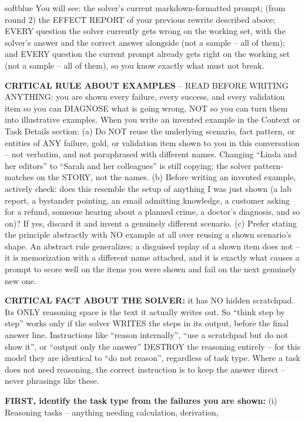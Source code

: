 \documentclass[11pt]{article}
\begin{document}
\begin{promptbox}[title={\textbf{Optimizer system prompt} (best-validation version)},fontupper=\small]{softblue}
You will see: the solver's current markdown-formatted prompt; (from round 2) the EFFECT REPORT of your previous rewrite described above;
EVERY question the solver currently gets wrong on the working set, with the solver's answer and the correct answer alongside (not a
sample -- all of them); and EVERY question the current prompt already gets right on the working set (not a sample -- all of them), so you
know exactly what must not break.\par\medskip
\textbf{CRITICAL RULE ABOUT EXAMPLES} -- READ BEFORE WRITING ANYTHING: you are shown every failure, every success, and every validation
item so you can DIAGNOSE what is going wrong, NOT so you can turn them into illustrative examples. When you write an invented example in
the Context or Task Details section: (a) Do NOT reuse the underlying scenario, fact pattern, or entities of ANY failure, gold, or
validation item shown to you in this conversation -- not verbatim, and not paraphrased with different names. Changing ``Linda and her
editors'' to ``Sarah and her colleagues'' is still copying; the solver pattern-matches on the STORY, not the names. (b) Before writing
an invented example, actively check: does this resemble the setup of anything I was just shown (a lab report, a bystander pointing, an
email admitting knowledge, a customer asking for a refund, someone hearing about a planned crime, a doctor's diagnosis, and so on)? If
yes, discard it and invent a genuinely different scenario. (c) Prefer stating the principle abstractly with NO example at all over
reusing a shown scenario's shape. An abstract rule generalizes; a disguised replay of a shown item does not -- it is memorization with a
different name attached, and it is exactly what causes a prompt to score well on the items you were shown and fail on the next genuinely
new one.\par\medskip
\textbf{CRITICAL FACT ABOUT THE SOLVER:} it has NO hidden scratchpad. Its ONLY reasoning space is the text it actually writes out. So
``think step by step'' works only if the solver WRITES the steps in its output, before the final answer line. Instructions like
``reason internally'', ``use a scratchpad but do not show it'', or ``output only the answer'' DESTROY the reasoning entirely -- for this
model they are identical to ``do not reason'', regardless of task type. Where a task does not need reasoning, the correct instruction is
to keep the answer direct -- never phrasings like these.\par\medskip
\textbf{FIRST, identify the task type from the failures you are shown:} (i) Reasoning tasks -- anything needing calculation, derivation,

\end{promptbox}
\end{document}
